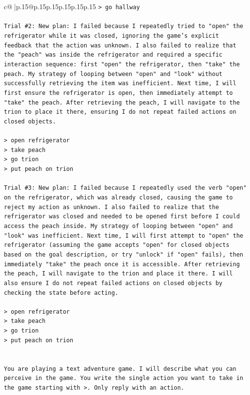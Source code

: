 \documentclass{article}
\begin{document}
{\begin{supertabular}{c@{$\;$}|p{.15\linewidth}@{}p{.15\linewidth}p{.15\linewidth}p{.15\linewidth}p{.15\linewidth}p{.15\linewidth}}
{{{\texttt{> go hallway} \\
\\ 
\texttt{Trial \#2: New plan: I failed because I repeatedly tried to "open" the refrigerator while it was closed, ignoring the game's explicit feedback that the action was unknown. I also failed to realize that the "peach" was inside the refrigerator and required a specific interaction sequence: first "open" the refrigerator, then "take" the peach. My strategy of looping between "open" and "look" without successfully retrieving the item was inefficient. Next time, I will first ensure the refrigerator is open, then immediately attempt to "take" the peach. After retrieving the peach, I will navigate to the trion to place it there, ensuring I do not repeat failed actions on closed objects.} \\
\\ 
\texttt{> open refrigerator} \\
\texttt{> take peach} \\
\texttt{> go trion} \\
\texttt{> put peach on trion} \\
\\ 
\texttt{Trial \#3: New plan: I failed because I repeatedly used the verb "open" on the refrigerator, which was already closed, causing the game to reject my action as unknown. I also failed to realize that the refrigerator was closed and needed to be opened first before I could access the peach inside. My strategy of looping between "open" and "look" was inefficient. Next time, I will first attempt to "open" the refrigerator (assuming the game accepts "open" for closed objects based on the goal description, or try "unlock" if "open" fails), then immediately "take" the peach once it is accessible. After retrieving the peach, I will navigate to the trion and place it there. I will also ensure I do not repeat failed actions on closed objects by checking the state before acting.} \\
\\ 
\texttt{> open refrigerator} \\
\texttt{> take peach} \\
\texttt{> go trion} \\
\texttt{> put peach on trion} \\
\\ 
\\ 
\texttt{You are playing a text adventure game. I will describe what you can perceive in the game. You write the single action you want to take in the game starting with >. Only reply with an action.} \\
}}}
\end{supertabular}}
\end{document}
